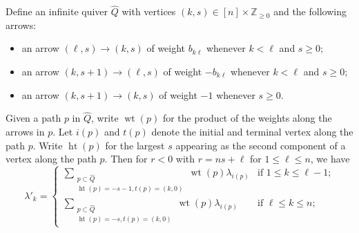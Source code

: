 \documentclass{amsart}
\numberwithin{theorem}{section}
\newcommand{\ZZ}{\mathbb{Z}}
\newcommand{\hgt}{\operatorname{ht}}
\newcommand{\wt}{{\operatorname{wt}}}
\begin{document}
  Define an infinite quiver $\widehat{Q}$ with vertices $(k,s)\in [n]\times\ZZ_{\ge0}$ and the following arrows:
  \begin{itemize}
    \item an arrow $(\ell,s)\to (k,s)$ of weight $b_{k\ell}$ whenever $k<\ell$ and $s\ge0$;
    \item an arrow $(k,s+1)\to (\ell,s)$ of weight $-b_{k\ell}$ whenever $k<\ell$ and $s\ge0$;
    \item an arrow $(k,s+1)\to (k,s)$ of weight $-1$ whenever $s\ge0$.
  \end{itemize}
  Given a path $p$ in $\widehat{Q}$, write $\wt(p)$ for the product of the weights along the arrows in $p$.
  Let $i(p)$ and $t(p)$ denote the initial and terminal vertex along the path $p$.
  Write $\hgt(p)$ for the largest $s$ appearing as the second component of a vertex along the path $p$.
  Then for $r<0$ with $r=ns+\ell$ for $1\le\ell\le n$, we have
  \[\lambda'_k=\begin{cases}\sum\limits_{\substack{p\subset\widehat{Q}\\ \hgt(p)=-s-1, t(p)=(k,0)}}\wt(p)\lambda_{i(p)} & \text{if $1\le k\le\ell-1$;}\\ \sum\limits_{\substack{p\subset\widehat{Q}\\ \hgt(p)=-s, t(p)=(k,0)}}\wt(p)\lambda_{i(p)} & \text{if $\ell\le k\le n$;} \end{cases}\]


  
\end{document}
